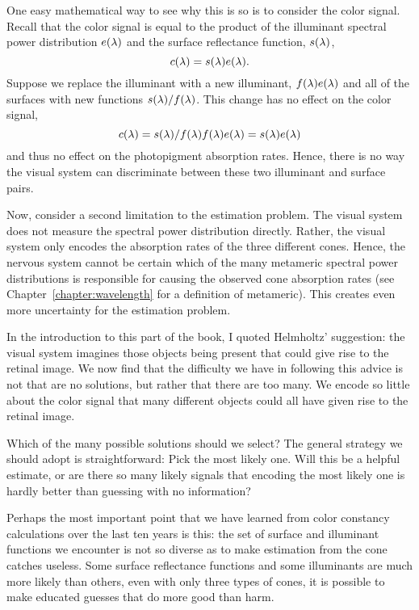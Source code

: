 One easy mathematical way to see why this is so is to consider the
color signal.  Recall that the color signal is equal to the product of
the illuminant spectral power distribution $\mbox{$e(\lambda)$}$ and the
surface reflectance function, $\mbox{$s(\lambda)$}$,
\[
\mbox{$c(\lambda)$} = \mbox{$s(\lambda)$} \mbox{$e(\lambda)$} .
\]
Suppose we replace the illuminant with a new illuminant, $f(\lambda)
\mbox{$e(\lambda)$}$ and all of the surfaces with new functions
$\mbox{$s(\lambda)$} / f(\lambda)$.  This change has no effect on the color
signal,
\[
\mbox{$c(\lambda)$} = \mbox{$s(\lambda)$} / f(\lambda) f(\lambda) \mbox{$e(\lambda)$}
= \mbox{$s(\lambda)$} \mbox{$e(\lambda)$}
\]
and thus no effect on the photopigment absorption rates.  Hence, there
is no way the visual system can discriminate between these two
illuminant and surface pairs.

Now, consider a second limitation to the estimation problem.  The
visual system does not measure the spectral power distribution
directly.  Rather, the visual system only encodes the absorption rates
of the three different cones.  Hence, the nervous system cannot be
certain which of the many metameric spectral power distributions is
responsible for causing the observed cone absorption rates (see
Chapter~\ref{chapter:wavelength} for a definition of metameric).  This
creates even more uncertainty for the estimation problem.

In the introduction to this part of the book, I quoted Helmholtz'
suggestion: the visual system imagines those objects being present
that could give rise to the retinal image.  We now find that the
difficulty we have in following this advice is not that are no
solutions, but rather that there are too many.  We encode so little
about the color signal that many different objects could all have
given rise to the retinal image.

Which of the many possible solutions should we select?  The general
strategy we should adopt is straightforward: Pick the most likely one.
Will this be a helpful estimate, or are there so many likely signals
that encoding the most likely one is hardly better than guessing with
no information?

Perhaps the most important point that we have learned from color
constancy calculations over the last ten years is this: the set of
surface and illuminant functions we encounter is not so diverse as to
make estimation from the cone catches useless.  Some surface
reflectance functions and some illuminants are much more likely than
others, even with only three types of cones, it is possible to make
educated guesses that do more good than harm.

